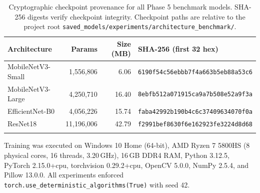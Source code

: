 \documentclass[pdflatex,sn-mathphys-num]{sn-jnl}
\theoremstyle{thmstyleone}%
\theoremstyle{thmstyletwo}%
\theoremstyle{thmstylethree}%
\begin{document}
\begin{table}[h]
\caption{Cryptographic checkpoint provenance for all Phase 5 benchmark models.
SHA-256 digests verify checkpoint integrity. Checkpoint paths are relative to the
project root \texttt{saved\_models/experiments/architecture\_benchmark/}.}\label{tab:checkpoints}%
\setlength{\tabcolsep}{3.5pt}%
\begin{tabular*}{\textwidth}{@{\extracolsep\fill}lrrl}
\toprule
\textbf{Architecture} & \textbf{Params} & \textbf{Size (MB)} & \textbf{SHA-256 (first 32 hex)} \\
\midrule
MobileNetV3-Small  & 1{,}556{,}806 &  6.06 & \texttt{6190f54c56ebbb7f4a663b5eb88a53c6} \\
MobileNetV3-Large  & 4{,}250{,}710 & 16.40 & \texttt{8ebfb512a071915ca9a7b508e52a9f3a} \\
EfficientNet-B0    & 4{,}056{,}226 & 15.74 & \texttt{faba42992b190b4c6c37409634070f0a} \\
ResNet18           & 11{,}196{,}006 & 42.79 & \texttt{f2991bef8630f6e162923fe3224d8d68} \\
\botrule
\end{tabular*}
\end{table}

\noindent Training was executed on Windows 10 Home (64-bit), AMD Ryzen 7 5800HS (8 physical cores, 16 threads, 3.20\,GHz), 16\,GB DDR4 RAM, Python 3.12.5, PyTorch 2.15.0+cpu, torchvision 0.29.2+cpu, OpenCV 5.0.0, NumPy 2.5.4, and Pillow 13.0.0. All experiments enforced \texttt{torch.use\_deterministic\_algorithms(True)} with seed 42.
\end{document}
